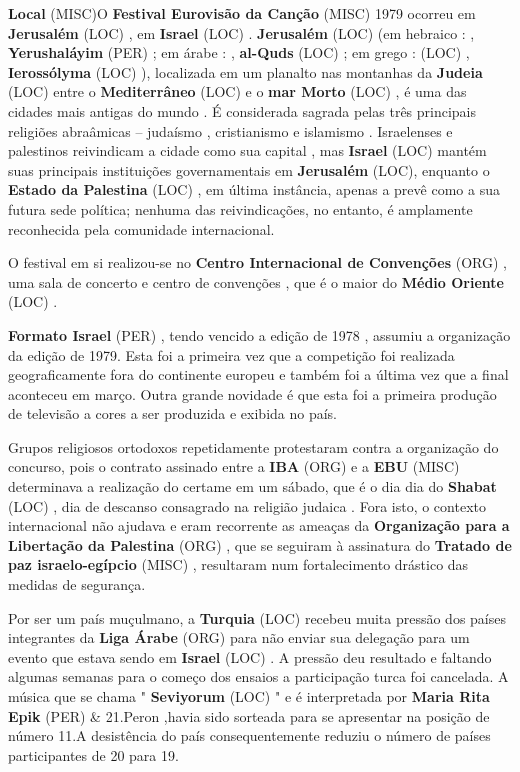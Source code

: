 \documentclass[12pt,a4paper]{article}
\begin{document}
\textbf{Local} (MISC)O \textbf{Festival Eurovisão da Canção} (MISC) 1979 ocorreu em \textbf{Jerusalém} (LOC) , em \textbf{Israel} (LOC) . \textbf{Jerusalém} (LOC) (em hebraico :  , \textbf{Yerushaláyim} (PER) ; em árabe :  , \textbf{al-Quds} (LOC) ; em grego : \textbf{} (LOC) , \textbf{Ierossólyma} (LOC) ), localizada em um planalto nas montanhas da \textbf{Judeia} (LOC) entre o \textbf{Mediterrâneo} (LOC) e o \textbf{mar Morto} (LOC) , é uma das cidades mais antigas do mundo . É considerada sagrada pelas três principais religiões abraâmicas -- judaísmo , cristianismo e islamismo . Israelenses e palestinos reivindicam a cidade como sua capital , mas \textbf{Israel} (LOC) mantém suas principais instituições governamentais em \textbf{Jerusalém} (LOC), enquanto o \textbf{Estado da Palestina} (LOC) , em última instância, apenas a prevê como a sua futura sede política; nenhuma das reivindicações, no entanto, é amplamente reconhecida pela comunidade internacional.

O festival em si realizou-se no \textbf{Centro Internacional de Convenções} (ORG) , uma sala de concerto e centro de convenções , que é o maior do \textbf{Médio Oriente} (LOC) .



\textbf{Formato Israel} (PER) , tendo vencido a edição de 1978 , assumiu a organização da edição de 1979. Esta foi a primeira vez que a competição foi realizada geograficamente fora do continente europeu e também foi a última vez que a final aconteceu em março. Outra grande novidade é que esta foi a primeira produção de televisão a cores a ser produzida e exibida no país.

Grupos religiosos ortodoxos repetidamente protestaram contra a organização do concurso, pois o contrato assinado entre a \textbf{IBA} (ORG) e a \textbf{EBU} (MISC) determinava a realização do certame em um sábado, que é o dia dia do \textbf{Shabat} (LOC) , dia de descanso consagrado na religião judaica . Fora isto, o contexto internacional não ajudava e eram recorrente as ameaças da \textbf{Organização para a Libertação da Palestina} (ORG) , que se seguiram à assinatura do \textbf{Tratado de paz israelo-egípcio} (MISC) , resultaram num fortalecimento drástico das medidas de segurança.

Por ser um país muçulmano, a \textbf{Turquia} (LOC) recebeu muita pressão dos países integrantes da \textbf{Liga Árabe} (ORG) para não enviar sua delegação para um evento que estava sendo em \textbf{Israel} (LOC) . A pressão deu resultado e faltando algumas semanas para o começo dos ensaios a participação turca foi cancelada. A música que se chama " \textbf{Seviyorum} (LOC) " e é interpretada por \textbf{Maria Rita Epik} (PER) \& 21.Peron ,havia sido sorteada para se apresentar na posição de número 11.A desistência do país consequentemente reduziu o número de países participantes de 20 para 19.
\end{document}
